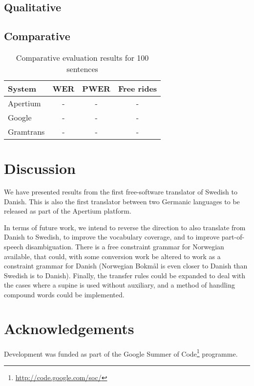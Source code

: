 \documentclass[11pt]{article}
\begin{document}
\subsection{Qualitative}


\subsection{Comparative}


\begin{table}
\centering
\begin{tabular}{|l|c|c|c|}
\hline
System & WER & PWER & Free rides\\
\hline
Apertium  & -   & -    & -\\
Google    & -   & -    & -\\
Gramtrans & -   & -    & -\\
\hline
\end{tabular}
    \caption{Comparative evaluation results for 100 sentences}
    \label{table:compeval}
\end{table}

\section{Discussion}

We have presented results from the first free-software translator of Swedish to Danish. This
is also the first translator between two Germanic languages to be released as part of the 
Apertium platform. 

In terms of future work, we intend to reverse the direction to also translate from Danish to 
Swedish, to improve the vocabulary coverage, and to improve part-of-speech disambiguation. There
is a free constraint grammar for Norwegian \citep{hagen2000cbt} available, that could, with some
conversion work be altered to work as a constraint grammar for Danish (Norwegian Bokmål is even
closer to Danish than Swedish is to Danish). Finally, the transfer rules could be expanded to 
deal with the cases where a supine is used without auxiliary, and a method of handling compound
words could be implemented.


\section*{Acknowledgements}

Development was funded as part of the Google Summer of Code\footnote{\url{http://code.google.com/soc/}} programme.



\end{document}
